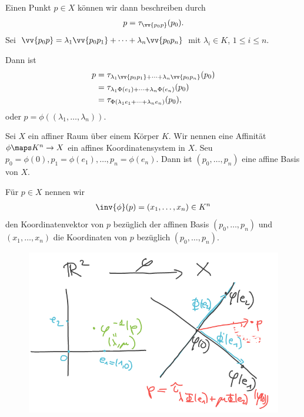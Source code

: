 Einen Punkt \( p\in X \) können wir dann beschreiben durch
\begin{align*}
    p=\tau_{\vv{p_0 p}}(p_0).
\end{align*}
Sei \( \vv{p_0 p}=\lambda_1 \vv{p_0 p_1}+\dotsb +\lambda_n \vv{p_0 p_n} \) mit \( \lambda_i\in K \), \( 1\leq i \leq n \).

Dann ist
\begin{align*}
    p \begin{aligned}[t]
        &=\tau_{\lambda_1\vv{p_0 p_1}+\dotsb +\lambda_n\vv{p_0 p_n}}(p_0)\\
        &=\tau_{\lambda_1 \Phi(e_1)+\dotsb+\lambda_n \Phi(e_n)}(p_0)\\
        &=\tau_{\Phi(\lambda_1 e_1+\dotsb+\lambda_n e_n)}(p_0),
    \end{aligned}
\end{align*}
oder \( p=\phi((\lambda_1,\dotsc,\lambda_n)) \).

\begin{definition*}
    Sei \( X \) ein affiner Raum über einem Körper \( K \). Wir nennen eine Affinität \( \phi\maps K^n\to X \) ein affines Koordinatensystem in \( X \). Seu \( p_0=\phi(0),p_1=\phi(e_1),\dotsc, p_n=\phi(e_n) \). Dann ist \( (p_0,\dotsc,p_n) \) eine affine Basis von \( X \).

    Für \( p\in X \) nennen wir
    \begin{align*}
        \inv{\phi}(p)=(x_1,\dotsc,x_n)\in K^n
    \end{align*}
    den Koordinatenvektor von \( p \) bezüglich der affinen Basis \( (p_0,\dotsc,p_n) \) und \( (x_1,\dotsc, x_n) \) die Koordinaten von \( p \) bezüglich \( (p_0,\dotsc, p_n) \).
    \begin{figure}[H]
        \centering
        \includegraphics[width=0.7\linewidth]{figures/affine_koordinatenabbildung_r_2}
        \label{fig:affine_koordinatenabbildung_r_2}
    \end{figure}
\end{definition*}
